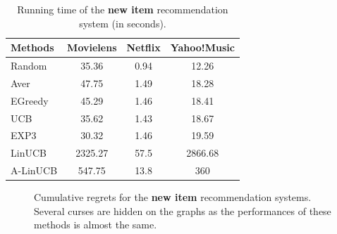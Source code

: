 \documentclass[twoside,leqno,twocolumn]{article}
\begin{document}
\begin{table}
  \caption{Running time of the \textbf{new item} recommendation system (in seconds).}
  \centering
  \begin{tabular}{|l|c|c|c|}
    \hline
    Methods & Movielens & Netflix & Yahoo!Music \\
    \hline
    Random & 35.36 & 0.94 & 12.26\\
    \hline
    Aver & 47.75 & 1.49 & 18.28 \\
    \hline	
    EGreedy & 45.29 & 1.46 & 18.41\\
    \hline  
    UCB & 35.62 & 1.43 & 18.67\\
    \hline
    EXP3 & 30.32 & 1.46 & 19.59\\
    \hline
     LinUCB & 2325.27 & 57.5 & 2866.68 \\
    \hline
    A-LinUCB & 547.75 & 13.8 & 360\\
    \hline
  \end{tabular}
  \label{table:newItemTime}
\end{table}
\begin{figure}[ht!]
  \centering
  \begin{center}
  \end{center}
  \caption{Cumulative regrets for the \textbf{new item} recommendation systems. Several curses are hidden on the graphs as the performances of these methods is almost the same.}
  \label{fig:newItem}
\end{figure}
\end{document}
